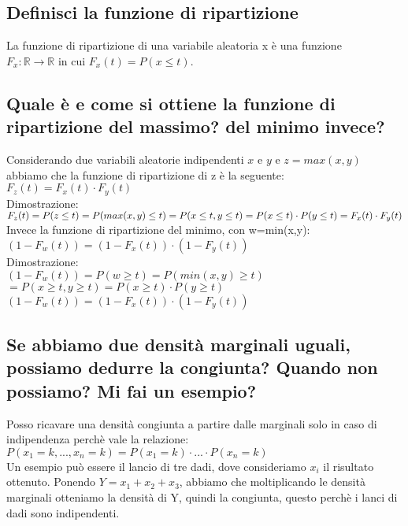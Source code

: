 \documentclass[a4paper,12pt]{report}
\begin{document}
	\subsection{Definisci la funzione di ripartizione}
	La funzione di ripartizione di una variabile aleatoria x è una funzione \\$F_x : \mathbb{R} \rightarrow \mathbb{R}$ in cui $F_x(t) = P(x \leq t)$. 
	\subsection{Quale è e come si ottiene la funzione di ripartizione del massimo? del minimo invece?}
	Considerando due variabili aleatorie indipendenti $x$ e $y$ e $z=max(x, y)$ abbiamo che la funzione di ripartizione di z è la seguente: \\
	$F_z(t) = F_x(t) \cdot F_y(t)$ \\
	Dimostrazione:\\
	$F_z(t) = P(z \leq t) = P(max(x, y) \leq t) = P(x \leq t, y \leq t) \\= P(x \leq t) \cdot P(y \leq t) = F_x(t) \cdot F_y(t)$ \\
	Invece la funzione di ripartizione del minimo, con w=min(x,y): \\
	$(1 - F_w(t)) = (1 - F_x(t)) \cdot (1 - F_y(t))$ \\
	Dimostrazione:\\
	$(1 - F_w(t)) = P(w \ge t) = P(min(x, y) \ge t)$ \\
	$= P(x \ge t, y \ge t) = P(x \ge t) \cdot P(y \ge t)$ \\
	$(1 - F_w(t)) = (1 - F_x(t)) \cdot (1 - F_y(t))$
	\subsection{Se abbiamo due densità marginali uguali, possiamo dedurre la congiunta? Quando non possiamo? Mi fai un esempio?}
	Posso ricavare una densità congiunta a  partire dalle marginali solo in caso di indipendenza perchè vale la relazione: \\
	$P(x_1=k, ..., x_n = k) = P(x_1 = k) \cdot ... \cdot P(x_n = k)$ \\
	Un esempio può essere il lancio di tre dadi, dove consideriamo $x_i$ il risultato ottenuto. Ponendo $Y = x_1 + x_2 + x_3$, abbiamo che moltiplicando le densità marginali otteniamo la densità di Y, quindi la congiunta, questo perchè i lanci di dadi sono indipendenti.
\end{document}
